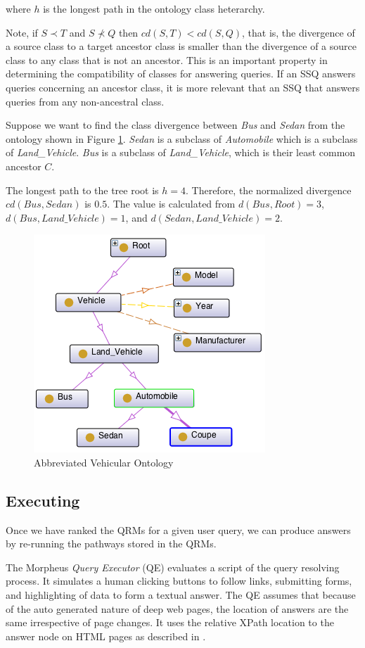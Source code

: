 \noindent where $h$ is the longest path in the ontology class heterarchy.

Note, if $S \prec T$ and $S \not\prec Q$ then $cd(S,T) < cd(S,Q)$, that is, the divergence of a source class to a target ancestor class is smaller than the divergence of a source class to any class that is not an ancestor. This is an important property in determining the compatibility of classes for answering queries.  If an SSQ answers queries concerning an ancestor class, it is more relevant that an SSQ that answers queries from any non-ancestral class.

Suppose we want to find the class divergence between \emph{Bus} and \emph{Sedan} from the ontology shown in Figure \ref{fig:vehicular_ontology}. \emph{Sedan} is a subclass of \emph{Automobile} which is a subclass of \emph{Land\_Vehicle}.  \emph{Bus} is a subclass of \emph{Land\_Vehicle}, which is their least common ancestor $C$.  

The longest path to the tree root is $h = 4$. Therefore, the normalized divergence $cd(Bus, Sedan)$ is $0.5$. The value is calculated from $d(Bus, Root) = 3$, $d(Bus, Land\_Vehicle) = 1$, and $d(Sedan, Land\_Vehicle) = 2$.

\begin{figure}[h]
	\centering
	\includegraphics[scale=0.90]{OntologyDiagram.png}
	\caption{Abbreviated Vehicular Ontology}
	\label{fig:vehicular_ontology}
\end{figure}

\subsection{Executing} 

Once we have ranked the QRMs for a given user query, we can produce answers by re-running the pathways stored in the QRMs.

The Morpheus \emph{Query Executor} (QE) evaluates a script of the query resolving process.  It simulates a human clicking buttons to follow links, submitting forms, and highlighting of data to form a textual answer.  The QE assumes that because of the auto generated nature of deep web pages, the location of answers are the same irrespective of page changes.  It uses the relative XPath location to the answer node on HTML pages as described in \cite{Badica06}.


